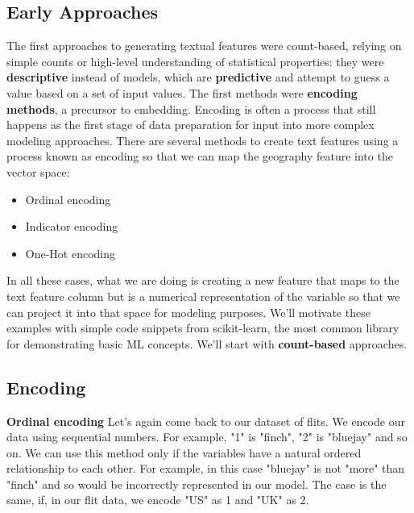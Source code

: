 \documentclass[11pt, table]{diazessay} %
\begin{document}
\begin{sloppypar}
\subsection{Early Approaches}

The first approaches to generating textual features were count-based, relying on simple counts or high-level understanding of statistical properties: they were \textbf{descriptive} instead of models, which are \textbf{predictive} and attempt to guess a value based on a set of input values.  The first methods were \textbf{encoding methods}, a precursor to embedding. Encoding is often a process that still happens as the first stage of data preparation for input into more complex modeling approaches.  There are several methods to create text features using a process known as encoding so that we can map the geography feature into the vector space:

\begin{itemize}
  \item Ordinal encoding   
  \item Indicator encoding
  \item One-Hot encoding
\end{itemize}

In all these cases, what we are doing is creating a new feature that maps to the text feature column but is a numerical representation of the variable so that we can project it into that space for modeling purposes. We'll motivate these examples with simple code snippets from scikit-learn, the most common library for demonstrating basic ML concepts. We'll start with \textbf{count-based} approaches.

\subsection{Encoding}
\textbf{Ordinal encoding}
Let's again come back to our dataset of flits. We encode our data using sequential numbers. For example, "1" is "finch", "2" is "bluejay" and so on. We can use this method only if the variables have a natural ordered relationship to each other. For example, in this case "bluejay" is not "more" than "finch" and so would be incorrectly represented in our model. The case is the same, if, in our flit data, we encode "US" as 1 and "UK" as 2.


\end{sloppypar}
\end{document}
